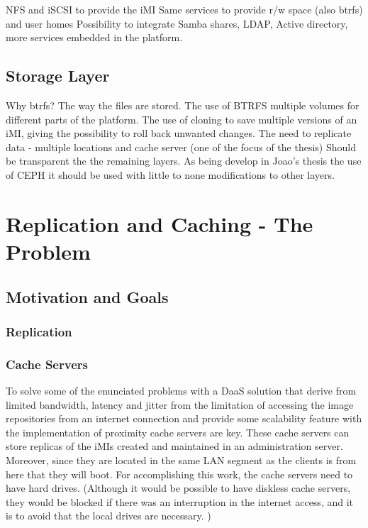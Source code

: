 NFS and iSCSI to provide the iMI
Same services to provide r/w space (also btrfs) and user homes
Possibility to integrate Samba shares, LDAP, Active directory, more services embedded in the platform.

\subsection{Storage Layer}
\label{sub:icbd_architecture_storage}

Why btrfs?
The way the files are stored.
The use of BTRFS multiple volumes for different parts of the platform.
The use of cloning to save multiple versions of an iMI, giving the possibility to roll back unwanted changes.
The need to replicate data - multiple locations and cache server (one of the focus of the thesis)
Should be transparent the the remaining layers. As being develop in Joao's thesis the use of CEPH it should be used with little to none modifications to other layers.


\section{Replication and Caching - The Problem}
\label{sec:replication_cache}


\subsection{Motivation and Goals}
\label{sub:motivation_goals}

\subsubsection{Replication}

\subsubsection{Cache Servers}

To solve some of the enunciated problems with a DaaS solution that derive from limited bandwidth, latency and jitter from the limitation of accessing the image repositories from an internet connection and provide some scalability feature with the implementation of proximity cache servers are key. These cache servers can store replicas of the iMIs created and maintained in an administration server. Moreover, since they are located in the same LAN segment as the clients is from here that they will boot.
For accomplishing this work, the cache servers need to have hard drives. (Although it would be possible to have diskless cache servers, they would be blocked if there was an interruption in the internet access, and it is to avoid that the local drives are necessary. )

